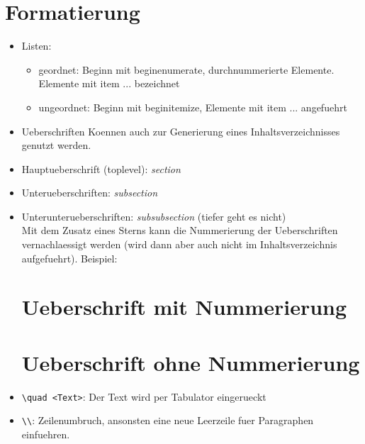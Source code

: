\documentclass[11pt]{report}
\begin{document}
\section{Formatierung}
\begin{itemize}
  \item Listen: 
  \begin{itemize}
  \item geordnet: Beginn mit begin{enumerate}, durchnummerierte Elemente. Elemente mit item ... bezeichnet
  \item ungeordnet: Beginn mit begin{itemize}, Elemente mit item ... angefuehrt
\end{itemize}

\item Ueberschriften
Koennen auch zur Generierung eines Inhaltsverzeichnisses genutzt werden. 
  \item Hauptueberschrift (toplevel): \emph{section}
  \item Unterueberschriften: \emph{subsection}
  \item Unterunterueberschriften: \emph{subsubsection} (tiefer geht es nicht)
  \\Mit dem Zusatz eines Sterns kann die Nummerierung der Ueberschriften vernachlaessigt werden (wird dann aber auch nicht im Inhaltsverzeichnis aufgefuehrt).
  Beispiel: 
  \begin{verbatim*} 
\section{Ueberschrift mit Nummerierung}
\section*{Ueberschrift ohne Nummerierung}
  \end{verbatim*}

  \item \verb|\quad <Text>|: Der Text wird per Tabulator eingerueckt
  \item \verb|\\|: Zeilenumbruch, ansonsten eine neue Leerzeile fuer Paragraphen einfuehren.
\end{itemize}
\end{document}
